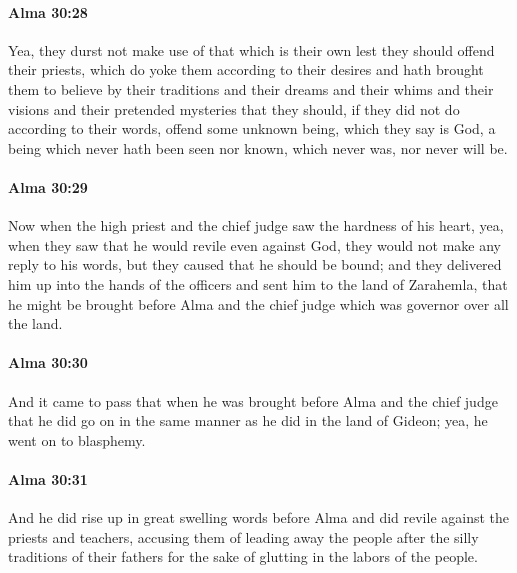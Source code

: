 		\paragraph{Alma 30:28} %
			\label{ALMA-30-28}

			Yea, they durst not make use of that which is their own
			lest they should offend their priests,
			which do yoke them according to their desires
			and hath brought them to believe by their traditions and their dreams
			and their whims and their visions and their pretended mysteries
			that they should, if they did not do according to their words,
			offend some unknown being, which they say is God,
			a being which never hath been seen nor known,
			which never was, nor never will be.

		\paragraph{Alma 30:29} %
			\label{ALMA-30-29}

			Now when the high priest and the chief judge saw the hardness of his heart,
			yea, when they saw that he would revile even against God,
			they would not make any reply to his words,
			but they caused that he should be bound;
			and they delivered him up into the hands of the officers
			and sent him to the land of Zarahemla,
			that he might be brought before Alma and the chief judge
			which was governor over all the land.

		\paragraph{Alma 30:30} %
			\label{ALMA-30-30}

			And it came to pass that when he was brought before Alma and the chief judge
			that he did go on in the same manner as he did in the land of Gideon;
			yea, he went on to blasphemy.

		\paragraph{Alma 30:31} %
			\label{ALMA-30-31}

			And he did rise up in great swelling words before Alma
			and did revile against the priests and teachers,
			accusing them of leading away the people after the silly traditions of their fathers
			for the sake of glutting in the labors of the people.


